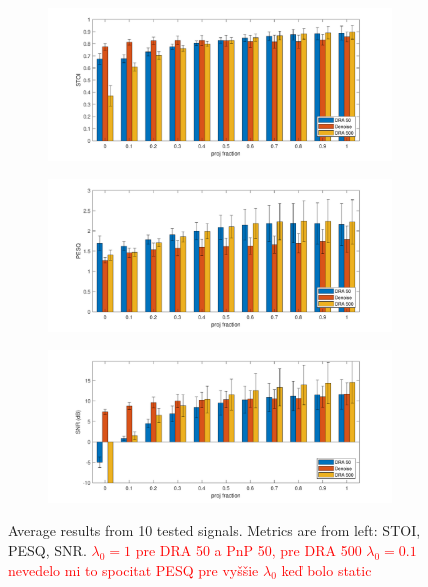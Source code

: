 \documentclass[conference]{IEEEtran}
\newcommand{\todo}[1]{\textcolor{red}{#1}}
\begin{document}
\begin{figure}[t]
	\begin{subfigure}{.33\textwidth}
		\centering
		\includegraphics[width=1.1\linewidth]{figures/lam1_stoi}  
	\end{subfigure}
	\begin{subfigure}{.33\textwidth}
		\centering
		\includegraphics[width=1.1\linewidth]{figures/lam1_PESQ}  
	\end{subfigure}
	\begin{subfigure}{.33\textwidth}
		\centering
		\includegraphics[width=1.1\linewidth]{figures/lam1_SNR}  
	\end{subfigure}
	\caption{Average results from 10 tested signals. Metrics are from left: STOI, PESQ, SNR.
		\todo{$\lambda_0 = 1 $ pre DRA 50 a PnP 50, pre DRA 500 $\lambda_0=0.1$ nevedelo mi to spocitat PESQ pre vyššie $\lambda_0$ keď bolo static}
		}
	\label{fig:final3witherrors}
\end{figure}
\end{document}
